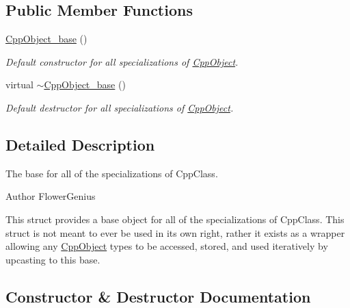 \subsection*{Public Member Functions}
\begin{DoxyCompactItemize}
\item 
\hyperlink{structsheila_1_1cpp_1_1CppObject__base_ad2b023b8aa000845a49e3c09bb3ece64}{Cpp\+Object\+\_\+base} ()
\begin{DoxyCompactList}\small\item\em Default constructor for all specializations of {\ttfamily \hyperlink{classsheila_1_1cpp_1_1CppObject}{Cpp\+Object}}. \end{DoxyCompactList}\item 
virtual \hyperlink{structsheila_1_1cpp_1_1CppObject__base_aa5a1f3ffa146f2acfce90e1db2a9e5f9}{$\sim$\+Cpp\+Object\+\_\+base} ()
\begin{DoxyCompactList}\small\item\em Default destructor for all specializations of {\ttfamily \hyperlink{classsheila_1_1cpp_1_1CppObject}{Cpp\+Object}}. \end{DoxyCompactList}\end{DoxyCompactItemize}


\subsection{Detailed Description}
The base for all of the specializations of {\ttfamily Cpp\+Class}. 

\begin{DoxyAuthor}{Author}
Flower\+Genius
\end{DoxyAuthor}
This struct provides a base object for all of the specializations of {\ttfamily Cpp\+Class}. This struct is not meant to ever be used in it\textquotesingle{}s own right, rather it exists as a wrapper allowing any {\ttfamily \hyperlink{classsheila_1_1cpp_1_1CppObject}{Cpp\+Object}} types to be accessed, stored, and used iteratively by upcasting to this base. 

\subsection{Constructor \& Destructor Documentation}

